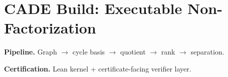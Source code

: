 \section*{CADE Build: Executable Non-Factorization}

\textbf{Pipeline.}
Graph $\to$ cycle basis $\to$ quotient $\to$ rank $\to$ separation.

\textbf{Certification.}
Lean kernel + certificate-facing verifier layer.
